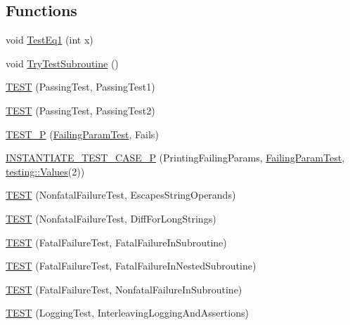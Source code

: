 \subsection*{Functions}
\begin{DoxyCompactItemize}
\item 
void \mbox{\hyperlink{googletest-output-test___8cc_a8f28d985b030c6dd2714d1e884c62c41}{Test\+Eq1}} (int x)
\item 
void \mbox{\hyperlink{googletest-output-test___8cc_a14e796981ca8d3c71dbd2b839c1ce784}{Try\+Test\+Subroutine}} ()
\item 
\mbox{\hyperlink{googletest-output-test___8cc_a62f1870b5f6ce5c731fe0606a944da39}{T\+E\+ST}} (Passing\+Test, Passing\+Test1)
\item 
\mbox{\hyperlink{googletest-output-test___8cc_aaf792b2d65c4aeb1e2f1804e2319afd2}{T\+E\+ST}} (Passing\+Test, Passing\+Test2)
\item 
\mbox{\hyperlink{googletest-output-test___8cc_a680b45844b58c5367da52c5383aea03a}{T\+E\+S\+T\+\_\+P}} (\mbox{\hyperlink{classFailingParamTest}{Failing\+Param\+Test}}, Fails)
\item 
\mbox{\hyperlink{googletest-output-test___8cc_a738114469b574e436c868a48d831f334}{I\+N\+S\+T\+A\+N\+T\+I\+A\+T\+E\+\_\+\+T\+E\+S\+T\+\_\+\+C\+A\+S\+E\+\_\+P}} (Printing\+Failing\+Params, \mbox{\hyperlink{classFailingParamTest}{Failing\+Param\+Test}}, \mbox{\hyperlink{namespacetesting_a8209ef59db08b8ad4beed30d8d6e6a88}{testing\+::\+Values}}(2))
\item 
\mbox{\hyperlink{googletest-output-test___8cc_a1ae5db2b27aea7d9f321f52002d4a501}{T\+E\+ST}} (Nonfatal\+Failure\+Test, Escapes\+String\+Operands)
\item 
\mbox{\hyperlink{googletest-output-test___8cc_aaa6c1704a62b7412fd5e053614f47650}{T\+E\+ST}} (Nonfatal\+Failure\+Test, Diff\+For\+Long\+Strings)
\item 
\mbox{\hyperlink{googletest-output-test___8cc_a6076f79ee5f9e8982bba181cbbebb0ed}{T\+E\+ST}} (Fatal\+Failure\+Test, Fatal\+Failure\+In\+Subroutine)
\item 
\mbox{\hyperlink{googletest-output-test___8cc_a8763e3844bd21de9bd7126658a4279c5}{T\+E\+ST}} (Fatal\+Failure\+Test, Fatal\+Failure\+In\+Nested\+Subroutine)
\item 
\mbox{\hyperlink{googletest-output-test___8cc_afe609aef34a68a2ab9809eb48112c5cc}{T\+E\+ST}} (Fatal\+Failure\+Test, Nonfatal\+Failure\+In\+Subroutine)
\item 
\mbox{\hyperlink{googletest-output-test___8cc_ad9bbf46060935b29c42d3116ddbc3566}{T\+E\+ST}} (Logging\+Test, Interleaving\+Logging\+And\+Assertions)

\end{DoxyCompactItemize}
